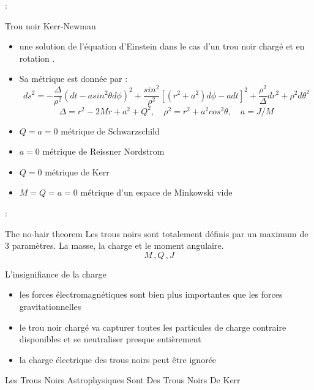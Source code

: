\begin{frame}{\underline{\secname} : {\small \subsecname}}

\begin{block}{Trou noir Kerr-Newman}
	
	
	\begin{itemize}
		\item  une solution de l'équation d'Einstein dans le cas d'un trou noir chargé et en rotation .
		
		\item Sa métrique est donnée par :
		$$ds^{2}=-\dfrac{\Delta}{\rho^{2}}(dt-asin^{2}\theta d\phi)^{2}+\dfrac{sin^{2}}{\rho^{2}}[(r^{2}+a^{2})d\phi-adt]^{2}+\dfrac{\rho^{2}}{\Delta}dr^{2}+\rho^{2}d\theta^{2}$$
		$$\Delta=r^{2}-2Mr+a^{2}+Q^{2} ,\quad	\rho^{2}=r^{2}+a^{2}cos^{2}\theta ,\quad a={J}/{M}$$
		
		
	\end{itemize}
\pause
\begin{itemize}
			  \setlength\itemsep{0em}
	\item  $Q=a=0$ \Rightarrow métrique de Schwarzschild
\item $a=0$ \Rightarrow métrique de Reissner Nordstrom
\item $ Q=0$ \Rightarrow métrique de Kerr
\item $M=Q=a=0$ \Rightarrow métrique d’un espace de Minkowski vide
\end{itemize}
\end{block}
\end{frame}


\begin{frame}{\underline{\secname} : {\small \subsecname}}
\begin{block}{The no-hair theorem}
	Les trous noirs sont totalement définis par un maximum de 3 paramètres. La masse, la charge et le moment angulaire.	$$M\,, Q\,, J $$
\end{block}

\begin{block}{L'insignifiance de la charge}
\begin{itemize}
				  \setlength\itemsep{0em}
	\item les forces électromagnétiques sont bien plus importantes que les forces gravitationnelles
\item le trou noir chargé va capturer toutes les particules de charge contraire disponibles et se neutraliser presque entièrement
\item la charge électrique des trous noirs peut être ignorée
\end{itemize}
	\end{block}



\vspace{10pt}
\pause
\begin{center}
	{\Large Les Trous Noirs Astrophysiques Sont Des Trous Noirs De Kerr}
\end{center}

\end{frame}